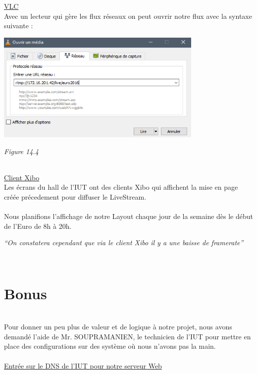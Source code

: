 \documentclass{report}
\begin{document}
    \underline{VLC}\\
    
    Avec un lecteur qui gère les flux réseaux on peut ouvrir notre flux avec la syntaxe suivante :\\

    \begin{center}
    \includegraphics[width=10cm]{img/vlc.png}
    
    \textit{\small{Figure 14.4}}
    \end{center}
    
    \\


    
    \underline{	Client Xibo}\\
    
    Les écrans du hall de l’IUT ont des clients Xibo qui affichent la mise en page créée précedement pour diffuser le LiveStream.
    \\
    \\
    Nous planifions l’affichage de notre Layout chaque jour de la semaine dès le début de l’Euro de 8h à 20h.


    \begin{center}
    \textit{    “On constatera cependant que via le client Xibo il y a une baisse de framerate”}
    \end{center}
    \\
    \newpage
    
    \section{Bonus}\\
    
    Pour donner un peu plus de valeur et de logique à notre projet, nous avons demandé l’aide de Mr. SOUPRAMANIEN, le technicien de l’IUT pour mettre en place des configurations sur des système où nous n’avons pas la main.
    \\
    \\
    \underline{Entrée sur le DNS de l’IUT pour notre serveur Web}\\
    
\end{document}

